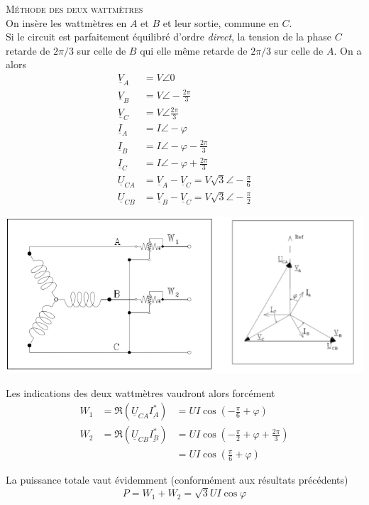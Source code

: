 \textsc{Méthode des deux wattmètres}\\
On insère les wattmètres en $A$ et $B$ et leur sortie, commune 
en $C$.\\
Si le circuit est parfaitement équilibré d'ordre \textit{direct}, 
la tension de la phase $C$ retarde de $2\pi/3$ sur celle de $B$ 
qui elle même retarde de $2\pi/3$ sur celle de $A$. On a alors
\begin{equation}
	\begin{array}{lll}
		\underline{V}_A    & = V \angle 0                                  \\
		\underline{V}_B    & = V\angle-\frac{2\pi}{3}                      \\
		\underline{V}_C    & = V\angle\frac{2\pi}{3}                       \\
		\underline{I}_A    & = I\angle-\varphi                             \\
		\underline{I}_B    & = I\angle-\varphi-\frac{2\pi}{3}              \\
		\underline{I}_C    & = I\angle-\varphi+\frac{2\pi}{3}              \\
		\underline{U}_{CA} & = \underline{V}_A-\underline{V}_C = V\sqrt{3} 
		\angle-\frac{\pi}{6}\\
		\underline{U}_{CB} & = \underline{V}_B-\underline{V}_C = V\sqrt{3  
		}\angle-\frac{\pi}{2}			
	\end{array}
\end{equation}
\begin{center}
	\includegraphics[scale=0.5]{ch1/image14.png}
\end{center}
Les indications des deux wattmètres vaudront alors forcément
\begin{equation}
	\begin{array}{lll}
		W_1 & = \Re(\underline{U}_{CA}\underline{I_A^*}) & = UI\cos(-\frac{\pi}{           
		6}+\varphi)\\
		W_2 & = \Re(\underline{U}_{CB}\underline{I_B^*}) & = UI\cos(-\frac{\pi}{           
		2}+\varphi+\frac{2\pi}{3})	\\
		    &                                            & = UI\cos(\frac{\pi}{6}+\varphi) 
	\end{array}
\end{equation}
			
La puissance totale vaut évidemment (conformément aux résultats précédents)
\begin{equation}
	P = W_1+W_2 = \sqrt{3}UI\cos\varphi
\end{equation}
		
		
		
		
		
		
		
		
		
		
		
		
		
		
		
		
		
		
